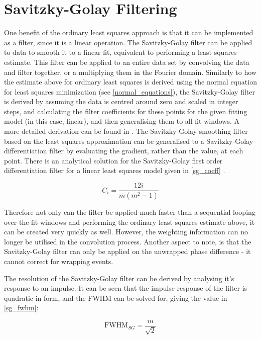 \section{Savitzky-Golay Filtering}\label{sg_filter}
One benefit of the ordinary least squares approach is that it can be implemented as a filter, since it is a linear operation. The Savitzky-Golay filter \cite{savitzky_smoothing_1964} can be applied to data to smooth it to a linear fit, equivalent to performing a least squares estimate. This filter can be applied to an entire data set by convolving the data and filter together, or a multiplying them in the Fourier domain. Similarly to how the estimate above for ordinary least squares is derived using the normal equation for least squares minimization (see \autoref{normal_equations}), the Savitzky-Golay filter is derived by assuming the data is centred around zero and scaled in integer steps, and calculating the filter coefficients for these points for the given fitting model (in this case, linear), and then generalising them to all fit windows. A more detailed derivation can be found in \cite{savitzky_smoothing_1964}. The Savitzky-Golay smoothing filter based on the least squares approximation can be generalised to a Savitzky-Golay differentiation filter by evaluating the gradient, rather than the value, at each point. There is an analytical solution for the Savitzky-Golay first order differentiation filter for a linear least squares model given in \autoref{sg_coeff} \cite{madden_comments_1978}.

\begin{equation}
	\label{sg_coeff}
	C_i = \frac{12 i}{m(m^2-1)}
\end{equation}

Therefore not only can the filter be applied much faster than a sequential looping over the fit windows and performing the ordinary least squares estimate above, it can be created very quickly as well. However, the weighting information can no longer be utilised in the convolution process. Another aspect to note, is that the Savitzky-Golay filter can only be applied on the unwrapped phase difference - it cannot correct for wrapping events. 

The resolution of the Savitzky-Golay filter can be derived by analysing it's response to an impulse. It can be seen that the impulse response of the filter is quadratic in form, and the FWHM can be solved for, giving the value in \autoref{sg_fwhm}:

\begin{equation}
	\label{sg_fwhm}
	\text{FWHM}_{SG} = \frac{m}{\sqrt{2}}
\end{equation}

